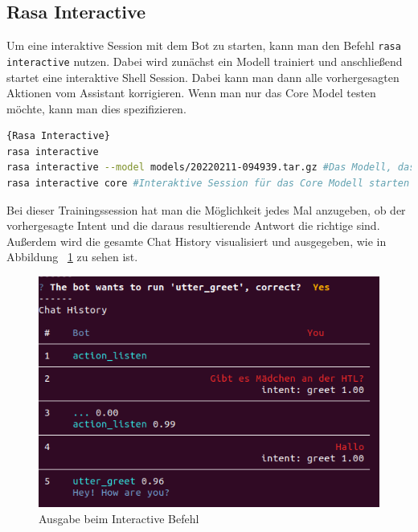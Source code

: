 \subsection{Rasa Interactive}

Um eine interaktive Session mit dem Bot zu starten, kann man den Befehl \texttt{rasa interactive} nutzen.
Dabei wird zunächst ein Modell trainiert und anschließend startet eine interaktive Shell Session.
Dabei kann man dann alle vorhergesagten Aktionen vom Assistant korrigieren.
Wenn man nur das Core Model testen möchte, kann man dies spezifizieren.

\begin{lstlisting}[language=bash,label={lst:interactive-command},caption={Interaktive Trainingssession starten}]{Rasa Interactive}
rasa interactive
rasa interactive --model models/20220211-094939.tar.gz #Das Modell, das verwendet werden soll
rasa interactive core #Interaktive Session für das Core Modell starten
\end{lstlisting}

Bei dieser Trainingssession hat man die Möglichkeit jedes Mal anzugeben, ob der vorhergesagte Intent und die daraus resultierende Antwort die richtige sind.
Außerdem wird die gesamte Chat History visualisiert und ausgegeben, wie in Abbildung ~\ref{fig:rasa_interactive} zu sehen ist.

\begin{figure}[hbt!]
    \centering
    \includegraphics[scale=0.80]{pics/rasa_interactive}
    \caption{Ausgabe beim Interactive Befehl}
    \label{fig:rasa_interactive}
\end{figure}
